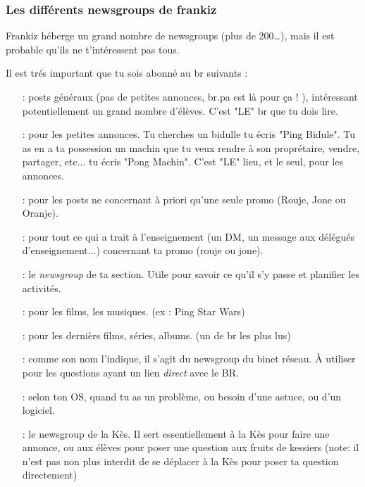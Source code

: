 \subsubsection{Les différents newsgroups de frankiz}
Frankiz héberge un grand nombre de newsgroups (plus de 200\dots ), mais il est probable qu'ils ne t'intéressent pas tous.

Il est trés important  que tu sois abonné au br suivants :
\begin{itemize}
\item[\ngname{br.eleves} :] posts généraux (pas de petites annonces, br.pa est là pour ça ! ), intéressant potentiellement un grand nombre d'élèves. C'est "LE" br que tu dois lire.
	 
\item[\ngname{br.pa} :] pour les petites annonces. Tu cherches un bidulle tu écris "Ping Bidule". Tu as en a ta possession un machin que tu veux rendre à son proprétaire, vendre, partager, etc... tu écris "Pong Machin". C'est "LE" lieu, et le seul, pour les annonces.

\item[\ngname{br.promo.*} :] pour les posts ne concernant à priori qu'une seule promo (Rouje, Jone ou Oranje).
	 
 \item[\ngname{br.enseignement.*} :] pour tout ce qui a trait à l'enseignement (un DM, un message aux délégués d'enseignement...) concernant ta promo (rouje ou jone).	 
 
 \item[\ngname{br.section.ta\_section\_sportive} :] le \emph{newsgroup} de ta section.                                        Utile pour savoir ce qu'il s'y passe et planifier les activités.

\item[\ngname{br.informatique.media.request} :] pour les films, les musiques. (ex : Ping Star Wars)

\item[\ngname{br.informatique.nouveautés} :] pour les dernièrs films, séries, albums. (un de br les plus lus)

\item[\ngname{br.binet.br} :] comme son nom l'indique, il s'agit du newsgroup du binet réseau. À utiliser pour les questions ayant un lien \emph{direct} avec le BR.

 \item[\ngname{br.informatique.windows/linux/mac} :] selon ton OS, quand tu as un problème, ou besoin d'une astuce, ou d'un logiciel.

 \item[\ngname{br.kes} :] le newsgroup de la Kès. Il sert essentiellement à la Kès pour faire une annonce, ou aux élèves pour poser une question aux fruits de kessiers (note: il n'est pas non plus interdit de se déplacer à la Kès pour poser ta question directement)

\end{itemize}

